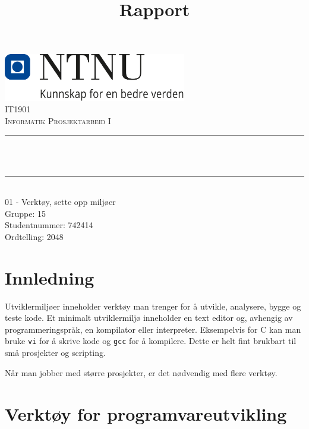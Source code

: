 \documentclass[12pt,a4paper]{article}
\title{Rapport}
\def \fagkode{IT1901}
\def \fagtittel{Informatik Prosjektarbeid I}
\def \studentnummer{742414}
\def \gruppenummer{15}
\def \ordtelling{2048}
\def \tema{01 - Verktøy, sette opp miljøer}
\begin{document}
\makeatletter
\begin{titlepage}
    \begin{center}
    \includegraphics[width=0.60\textwidth]{NTNU_logo.png}\\[1cm]
    \textsc{\Large \fagkode}\\[0.5cm]
    \textsc{\large \fagtittel}\\[0.5cm]

    \rule{\linewidth}{0.5mm} \\[0.4cm]
    { \huge \bfseries \@title \\[0.4cm] }
    \rule{\linewidth}{0.5mm} \\[1.5cm]

    \LARGE
    \tema\\[1cm]

    \large
    Gruppe: \gruppenummer\\[0.25cm]

    \large
    Studentnummer: \studentnummer\\[0.25cm]

    \large
    Ordtelling: \ordtelling

    \vfill

    \large
    \@date
    \end{center}
\end{titlepage}
\makeatother

\newpage

\section*{Innledning}

Utviklermiljøer inneholder verktøy man trenger for å utvikle, analysere,
bygge og teste kode. Et minimalt utviklermiljø inneholder en text editor
og, avhengig av programmeringspråk, en kompilator eller interpreter.
Eksempelvis for C kan man bruke \texttt{vi} for å skrive kode og
\texttt{gcc} for å kompilere. Dette er helt fint brukbart til små
prosjekter og scripting.

Når man jobber med større prosjekter, er det nødvendig med flere
verktøy.

\section*{Verktøy for programvareutvikling}
\end{document}
